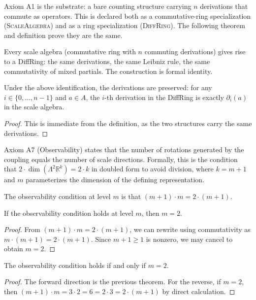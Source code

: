 Axiom A1 is the substrate: a bare counting structure carrying $n$ derivations that commute as operators. This is declared both as a commutative-ring specialization (\textsc{ScaleAlgebra}) and as a ring specialization (\textsc{DiffRing}). The following theorem and definition prove they are the same.

\begin{definition}
Every scale algebra (commutative ring with $n$ commuting derivations) gives rise to a DiffRing: the same derivations, the same Leibniz rule, the same commutativity of mixed partials. The construction is formal identity.
\end{definition}

\begin{theorem}
Under the above identification, the derivations are preserved: for any $i \in \{0,\ldots,n-1\}$ and $a \in A$, the $i$-th derivation in the DiffRing is exactly $\partial_i(a)$ in the scale algebra.
\end{theorem}
\begin{proof}
This is immediate from the definition, as the two structures carry the same derivations.
\end{proof}

Axiom A7 (Observability) states that the number of rotations generated by the coupling equals the number of scale directions. Formally, this is the condition that $2 \cdot \dim(\Lambda^2 \mathbb{R}^k) = 2 \cdot k$ in doubled form to avoid division, where $k = m + 1$ and $m$ parameterizes the dimension of the defining representation.

\begin{definition}
The observability condition at level $m$ is that $(m+1) \cdot m = 2 \cdot (m+1)$.
\end{definition}

\begin{theorem}
If the observability condition holds at level $m$, then $m = 2$.
\end{theorem}
\begin{proof}
From $(m+1) \cdot m = 2 \cdot (m+1)$, we can rewrite using commutativity as $m \cdot (m+1) = 2 \cdot (m+1)$. Since $m + 1 \ge 1$ is nonzero, we may cancel to obtain $m = 2$.
\end{proof}

\begin{theorem}
The observability condition holds if and only if $m = 2$.
\end{theorem}
\begin{proof}
The forward direction is the previous theorem. For the reverse, if $m = 2$, then $(m+1) \cdot m = 3 \cdot 2 = 6 = 2 \cdot 3 = 2 \cdot (m+1)$ by direct calculation.
\end{proof}
